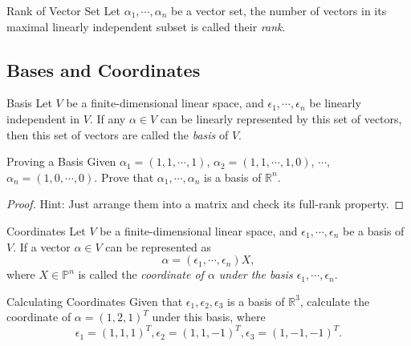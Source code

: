 \begin{definition}{Rank of Vector Set}{}
  Let $\alpha_1, \cdots, \alpha_n$ be a vector set,
  the number of vectors in its maximal linearly independent subset is called
  their \emph{rank}.
\end{definition}

\subsection{Bases and Coordinates}

\begin{definition}{Basis}{}
  Let $V$ be a finite-dimensional linear space,
  and $\epsilon_1, \cdots, \epsilon_n$ be linearly independent in $V$.
  If any $\alpha \in V$ can be linearly represented by this set of vectors,
  then this set of vectors are called the \emph{basis} of $V$.
\end{definition}

\begin{example}{Proving a Basis}{}
  Given $\alpha_1 = (1, 1, \cdots, 1)$,
  $\alpha_2 = (1, 1, \cdots, 1, 0)$,
  $\cdots$,
  $\alpha_n = (1, 0, \cdots, 0)$.
  Prove that $\alpha_1, \cdots, \alpha_n$ is a basis of $\mathbb{R}^n$.
\end{example}

\begin{proof}
  Hint: Just arrange them into a matrix and check its full-rank property.
\end{proof}

\begin{definition}{Coordinates}{}
  Let $V$ be a finite-dimensional linear space,
  and $\epsilon_1, \cdots, \epsilon_n$ be a basis of $V$.
  If a vector $\alpha \in V$ can be represented as
  \begin{equation}
    \alpha = (\epsilon_1, \cdots, \epsilon_n)X,
  \end{equation}
  where $X \in \mathbb{P}^n$ is called the \emph{coordinate of $\alpha$
  under the basis $\epsilon_1,\cdots, \epsilon_n$}.
\end{definition}

\begin{example}{Calculating Coordinates}{}
  Given that $\epsilon_{1}, \epsilon_2, \epsilon_3$ is a basis of
  $\mathbb{R}^3$,
  calculate the coordinate of $\alpha = (1, 2, 1)^T$ under this basis, where
  \begin{equation}
    \epsilon_1=(1,1,1)^T,\epsilon_2=(1,1,-1)^T,\epsilon_3=(1,-1,-1)^T.
    \end{equation}
\end{example}

